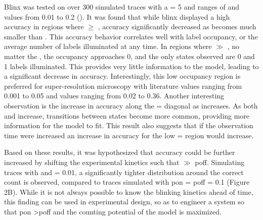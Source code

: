 Blinx was tested on over 300 simulated traces with a \truen = 5 and ranges of
\pon and \poff values from 0.01 to 0.2 (). It was found that while blinx
displayed a high accuracy in regions where \pon $\geq$ \poff, accuracy significantly
decreased as \pon becomes much smaller than \poff. This accuracy behavior
correlates well with label occupancy, or the average number of labels
illuminated at any time. In regions where \poff  $\gg$ \pon, no matter the \truen,
the occupancy approaches 0, and the only states observed are 0 and 1 labels
illuminated. This provides very little information to the model, leading to a
significant decrease in accuracy. Interestingly, this low occupancy region is
preferred for super-resolution microscopy with literature \pon values ranging
from 0.001 to 0.05 and \poff values ranging from 0.02 to 0.36. Another
interesting observation is the increase in accuracy along the \pon = \poff
diagonal as \pon increases. As both \pon and \poff increase, transitions between
states become more common, providing more information for the model to fit.
This result also suggests that if the observation time were increased an
increase in accuracy for the low \pon = \poff region would increase.

Based on these results, it was hypothesized that accuracy could be further
increased by shifting the experimental kinetics such that \pon $\gg$ poff. Simulating
traces with  and \poff= 0.01, a significantly tighter distribution
around the correct count is observed, compared to traces simulated with pon =
poff = 0.1 (Figure 2B). While it is not always possible to know the blinking
kinetics ahead of time, this finding can be used in experimental design, so as
to engineer a system so that pon \textgreater   poff and the counting potential of the model
is maximized.
